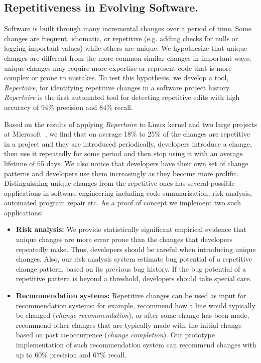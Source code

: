\documentclass[a4paper, 11pt]{article}
\begin{document}
\begin{small}
\subsection*{\small Repetitiveness in Evolving Software.} Software is built through many incremental changes 
over a period of time. Some changes are frequent, idiomatic, or repetitive (e.g. adding checks for nulls 
or logging important values) while others are unique. We hypothesize that unique changes are different from the more common similar 
changes in important ways;  unique changes may require more expertise or represent code that is more complex or prone to mistakes. 
To test this hypothesis, we  develop a tool, {\em Repertoire}, for identifying repetitive changes in a software project history~\cite{Ray2012:RCP}. 
{\em Repertoire} is the first automated tool for detecting repetitive edits with high accuracy of 94\% precision and 84\% recall.

Based on the results of applying {\em Repertoire} to Linux kernel and two large projects at Microsoft~\cite{ray2014unique}, 
we find that on average 18\% to 25\% of the changes are repetitive in a project and they are introduced periodically, \ie developers introduce a change, then use it repeatedly for some period and then stop using it with an average lifetime of 65 days. We also notice that developers have their own set of change patterns and developers use them increasingly as they become more prolific. Distinguishing unique changes from the 
repetitive ones has several possible applications in software engineering including code summarization, risk analysis,  automated program repair etc.
As a proof of concept we implement two such applications:

\begin{itemize}
\item \textbf{Risk analysis:} We provide statistically significant empirical evidence that unique changes are 
more error prone than the changes that developers repeatedly make. Thus, developers should be careful when introducing unique changes.
Also, our risk analysis system estimate bug potential of a repetitive change pattern, based on its previous bug history. 
If the bug potential of a repetitive pattern is beyond a threshold, developers should take special care. 

\item \textbf{Recommendation systems:} Repetitive changes can be used as input for 
recommendation systems: for example, recommend how a line would typically be changed 
({\em change recommendation}), or after some change has been made, recommend other changes 
that are typically made with the initial change based on past co-occurrence ({\em change completion}).
Our prototype implementation of such recommendation system can recommend changes with up to 60\% precision 
and 67\% recall.


\end{itemize}
\end{small}
\end{document}
